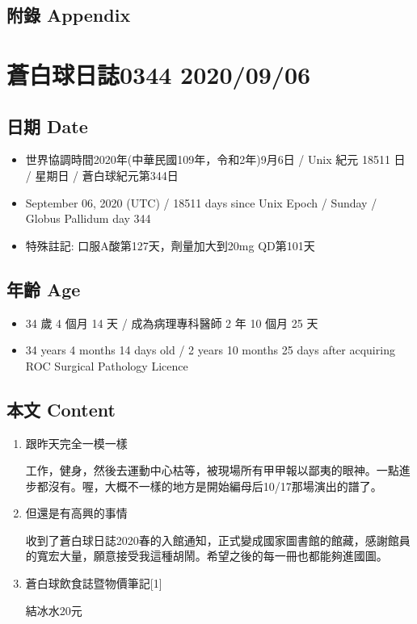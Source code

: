 \documentclass[a5paper, 11pt
]{book}
\providecommand{\tightlist}{%
  \setlength{\itemsep}{0pt}\setlength{\parskip}{0pt}}
\begin{document}
\hypertarget{ux9644ux9304-appendix-4}{%
\subsection{附錄 Appendix}\label{ux9644ux9304-appendix-4}}

\hypertarget{ux84bcux767dux7403ux65e5ux8a8c0344-20200906}{%
\section{蒼白球日誌0344
2020/09/06}\label{ux84bcux767dux7403ux65e5ux8a8c0344-20200906}}

\hypertarget{ux65e5ux671f-date-5}{%
\subsection{日期 Date}\label{ux65e5ux671f-date-5}}

\begin{itemize}
\tightlist
\item
  世界協調時間2020年(中華民國109年，令和2年)9月6日 / Unix 紀元 18511 日
  / 星期日 / 蒼白球紀元第344日
\item
  September 06, 2020 (UTC) / 18511 days since Unix Epoch / Sunday /
  Globus Pallidum day 344
\item
  特殊註記: 口服A酸第127天，劑量加大到20mg QD第101天
\end{itemize}

\hypertarget{ux5e74ux9f61-age-5}{%
\subsection{年齡 Age}\label{ux5e74ux9f61-age-5}}

\begin{itemize}
\tightlist
\item
  34 歲 4 個月 14 天 / 成為病理專科醫師 2 年 10 個月 25 天
\item
  34 years 4 months 14 days old / 2 years 10 months 25 days after
  acquiring ROC Surgical Pathology Licence
\end{itemize}

\hypertarget{ux672cux6587-content-5}{%
\subsection{本文 Content}\label{ux672cux6587-content-5}}

\begin{enumerate}
\def\labelenumi{\arabic{enumi}.}
\item
  跟昨天完全一模一樣

  工作，健身，然後去運動中心枯等，被現場所有甲甲報以鄙夷的眼神。一點進步都沒有。喔，大概不一樣的地方是開始編母后10/17那場演出的譜了。
\item
  但還是有高興的事情

  收到了蒼白球日誌2020春的入館通知，正式變成國家圖書館的館藏，感謝館員的寬宏大量，願意接受我這種胡鬧。希望之後的每一冊也都能夠進國圖。
\item
  蒼白球飲食誌暨物價筆記{[}1{]}

  結冰水20元
\end{enumerate}
\end{document}
